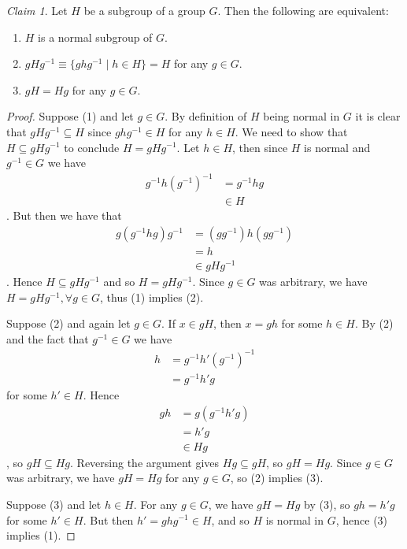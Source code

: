 \documentclass[12pt,letterpaper,DIV=11,final]{scrartcl}
\theoremstyle{plain}
\theoremstyle{definition}
\theoremstyle{remark}
\newtheorem{claim}{Claim}
\begin{document}
\begin{claim}
  Let $H$ be a subgroup of a group $G$.
  Then the following are equivalent:
  \begin{enumerate}
    \item $H$ is a normal subgroup of $G$.
    \item $g H g^{-1} \equiv \{ g h g^{-1} \mid h \in H \} = H$ for any $g \in G$.
    \item $g H = H g$ for any $g \in G$.
  \end{enumerate}

  \begin{proof}
    Suppose (1) and let $g \in G$.
    By definition of $H$ being normal in $G$ it is clear that $g H g^{-1} \subseteq H$ since $g h g^{-1} \in H$ for any $h \in H$.
    We need to show that $H \subseteq g H g^{-1}$ to conclude $H = g H g^{-1}$.
    Let $h \in H$, then since $H$ is normal and $g^{-1} \in G$ we have
    \begin{align*}
      g^{-1} h {(g^{-1})}^{-1} &= g^{-1} h g \\
                               &\in H
    \end{align*}.
    But then we have that
    \begin{align*}
      g (g^{-1} h g) g^{-1} &= (g g^{-1}) h (g g^{-1}) \\
                            &= h \\
                            &\in g H g^{-1}
    \end{align*}.
    Hence $H \subseteq g H g^{-1}$ and so $H = g H g^{-1}$.
    Since $g \in G$ was arbitrary, we have $H = g H g^{-1}, \forall g \in G$, thus (1) implies (2).

    Suppose (2) and again let $g \in G$.
    If $x \in gH$, then $x = gh$ for some $h \in H$.
    By (2) and the fact that $g^{-1} \in G$ we have
    \begin{align*}
      h &= g^{-1} h' {(g^{-1})}^{-1} \\
        &= g^{-1} h' g
    \end{align*}
    for some $h' \in H$.
    Hence
    \begin{align*}
      gh &= g (g^{-1} h' g) \\
         &= h' g \\
         &\in H g
    \end{align*},
    so $g H \subseteq H g$.
    Reversing the argument gives $H g \subseteq g H$, so $g H = H g$.
    Since $g \in G$ was arbitrary, we have $gH = Hg$ for any $g \in G$, so (2) implies (3).

    Suppose (3) and let $h \in H$.
    For any $g \in G$, we have $g H = H g$ by (3), so $gh = h'g$ for some $h' \in H$.
    But then $h' = g h g^{-1} \in H$, and so $H$ is normal in $G$, hence (3) implies (1).
  \end{proof}
\end{claim}
\end{document}
